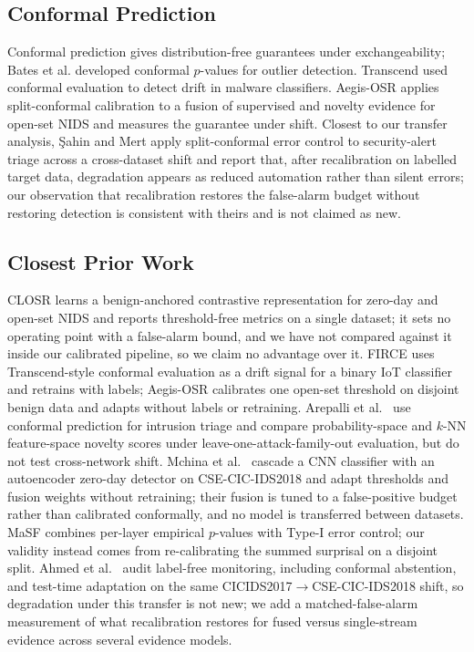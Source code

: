 \documentclass[conference]{IEEEtran}
\begin{document}
\subsection{Conformal Prediction}
Conformal prediction \cite{vovk2005algorithmic} gives distribution-free guarantees under exchangeability; Bates et al. \cite{bates2023testing} developed conformal $p$-values for outlier detection. Transcend \cite{jordaney2017transcend} used conformal evaluation to detect drift in malware classifiers. Aegis-OSR applies split-conformal calibration to a fusion of supervised and novelty evidence for open-set NIDS and measures the guarantee under shift. Closest to our transfer analysis, \c{S}ahin and Mert \cite{sahin2026dual} apply split-conformal error control to security-alert triage across a cross-dataset shift and report that, after recalibration on labelled target data, degradation appears as reduced automation rather than silent errors; our observation that recalibration restores the false-alarm budget without restoring detection is consistent with theirs and is not claimed as new.

\subsection{Closest Prior Work}
CLOSR \cite{wilkie2026closr} learns a benign-anchored contrastive representation for zero-day and open-set NIDS and reports threshold-free metrics on a single dataset; it sets no operating point with a false-alarm bound, and we have not compared against it inside our calibrated pipeline, so we claim no advantage over it. FIRCE \cite{barrett2026firce} uses Transcend-style conformal evaluation as a drift signal for a binary IoT classifier and retrains with labels; Aegis-OSR calibrates one open-set threshold on disjoint benign data and adapts without labels or retraining. Arepalli et al.\ \cite{arepalli2026conformal} use conformal prediction for intrusion triage and compare probability-space and $k$-NN feature-space novelty scores under leave-one-attack-family-out evaluation, but do not test cross-network shift. Mchina et al.\ \cite{mchina2026adaptive} cascade a CNN classifier with an autoencoder zero-day detector on CSE-CIC-IDS2018 and adapt thresholds and fusion weights without retraining; their fusion is tuned to a false-positive budget rather than calibrated conformally, and no model is transferred between datasets. MaSF \cite{haroush2022masf} combines per-layer empirical $p$-values with Type-I error control; our validity instead comes from re-calibrating the summed surprisal on a disjoint split. Ahmed et al.\ \cite{ahmed2026dashboard} audit label-free monitoring, including conformal abstention, and test-time adaptation on the same CICIDS2017$\to$CSE-CIC-IDS2018 shift, so degradation under this transfer is not new; we add a matched-false-alarm measurement of what recalibration restores for fused versus single-stream evidence across several evidence models.
\end{document}
